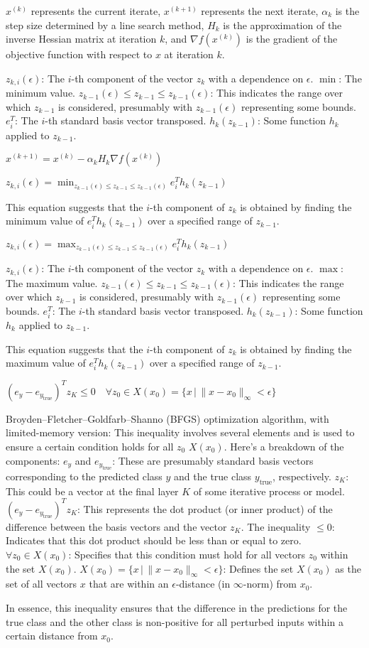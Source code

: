 $x^{(k)}$ represents the current iterate,
$x^{(k+1)}$ represents the next iterate,
$\alpha_k$ is the step size determined by a line search method,
$H_k$ is the approximation of the inverse Hessian matrix at iteration $k$, and
$\nabla f(x^{(k)})$ is the gradient of the objective function with respect to $x$ at iteration $k$.


$z_{k,i}(\epsilon)$: The $i$-th component of the vector $z_k$ with a dependence on $\epsilon$.
$\min$: The minimum value.
$z_{k-1}(\epsilon) \leq z_{k-1} \leq z_{k-1}(\epsilon)$: This indicates the range over which $z_{k-1}$ is considered, presumably with $z_{k-1}(\epsilon)$ representing some bounds.
$e^T_i$: The $i$-th standard basis vector transposed.
$h_k(z_{k-1})$: Some function $h_k$ applied to $z_{k-1}$.

$x^{(k+1)} = x^{(k)} - \alpha_k H_k \nabla f(x^{(k)})$

$z_{k,i}(\epsilon) = \min_{z_{k-1}(\epsilon) \leq z_{k-1} \leq z_{k-1}(\epsilon)} e^T_i h_k(z_{k-1})$

This equation suggests that the $i$-th component of $z_k$ is obtained by finding the minimum value of $e^T_i h_k(z_{k-1})$ over a specified range of $z_{k-1}$.

$z_{k,i}(\epsilon) = \max_{z_{k-1}(\epsilon) \leq z_{k-1} \leq z_{k-1}(\epsilon)} e^T_i h_k(z_{k-1})$

$z_{k,i}(\epsilon)$: The $i$-th component of the vector $z_k$ with a dependence on $\epsilon$.
$\max$: The maximum value.
$z_{k-1}(\epsilon) \leq z_{k-1} \leq z_{k-1}(\epsilon)$: This indicates the range over which $z_{k-1}$ is considered, presumably with $z_{k-1}(\epsilon)$ representing some bounds.
$e^T_i$: The $i$-th standard basis vector transposed.
$h_k(z_{k-1})$: Some function $h_k$ applied to $z_{k-1}$.

This equation suggests that the $i$-th component of $z_k$ is obtained by finding the maximum value of $e^T_i h_k(z_{k-1})$ over a specified range of $z_{k-1}$.

$(e_y - e_{y_{\text{true}}})^T z_K \leq 0 \quad \forall z_0 \in X(x_0) = \{x \,|\, \|x - x_0\|_{\infty} < \epsilon\}$

Broyden–Fletcher–Goldfarb–Shanno (BFGS) optimization algorithm, with limited-memory version: 
This inequality involves several elements and is used to ensure a certain condition holds for all  $z_0$  $X(x_0)$. Here's a breakdown of the components:
$e_y$ and $e_{y_{\text{true}}}$: These are presumably standard basis vectors corresponding to the predicted class $y$ and the true class $y_{\text{true}}$, respectively.
$z_K$: This could be a vector at the final layer $K$ of some iterative process or model.
$(e_y - e_{y_{\text{true}}})^T z_K$: This represents the dot product (or inner product) of the difference between the basis vectors and the vector $z_K$.
The inequality $\leq 0$: Indicates that this dot product should be less than or equal to zero.
$\forall z_0 \in X(x_0)$: Specifies that this condition must hold for all vectors $z_0$ within the set $X(x_0)$.
$X(x_0) = \{x \,|\, \|x - x_0\|_{\infty} < \epsilon\}$: Defines the set $X(x_0)$ as the set of all vectors $x$ that are within an $\epsilon$-distance (in $\infty$-norm) from $x_0$.

In essence, this inequality ensures that the difference in the predictions for the true class and the other class is non-positive for all perturbed inputs within a certain distance from $x_0$.
